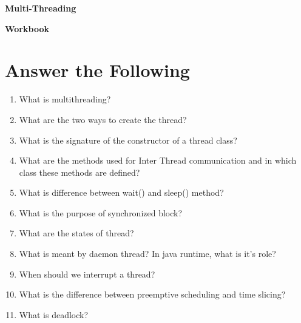 \documentclass[11pt,a4paper]{article}
\def\AnswerBox{\fbox{\begin{minipage}{4in}\hfill\vspace{0.5in}\end{minipage}}}
\begin{document}
\centerline{\huge{ \textbf{Multi-Threading}}}

\vspace{1pc}

\centerline{\huge{ \textbf{ Workbook}}}

\section*{Answer the Following}
\begin{enumerate}\itemsep10pt
\item What is multithreading?

\AnswerBox

\item  What are the two ways to create the thread?

\AnswerBox

\item  What is the signature of the constructor of a thread class?

\AnswerBox

\item  What are the methods used for Inter Thread communication and in which class these methods are defined?

\AnswerBox

\item  What is difference between wait() and sleep() method?

\AnswerBox

\item What is the purpose of synchronized block?

\AnswerBox

\item What are the states of thread?

\AnswerBox

\item What is meant by daemon thread? In java runtime, what is it's role?

\AnswerBox

\item When should we interrupt a thread?

\AnswerBox

\item What is the difference between preemptive scheduling and time slicing?

\AnswerBox

\item What is deadlock?

\AnswerBox

\end{enumerate}
\end{document}
